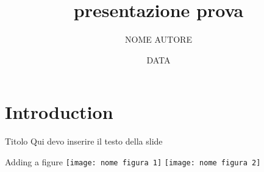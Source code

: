 \documentclass{beamer}
\title{presentazione prova}
\author{NOME AUTORE}
\date{DATA}
\begin{document}
\maketitle

\section{Introduction}
\begin{frame}{Titolo}
Qui devo inserire il testo della slide
\end{frame}

\begin{frame}{Adding a figure}
\centering
 \texttt{[image: nome figura 1]}
 \texttt{[image: nome figura 2]}
\end{frame}
\end{document}
